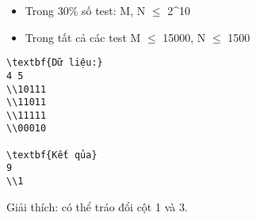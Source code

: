 \begin{itemize}
	\item     Trong 30\% số test: M, N  $\le$  2^10   
	\item     Trong tất cả các test M  $\le$  15000, N  $\le$  1500   
\end{itemize}
\begin{verbatim}
\textbf{Dữ liệu:}
4 5
\\10111
\\11011
\\11111
\\00010

\textbf{Kết qủa}
9
\\1
\end{verbatim}

   Giải thích: có thể tráo đổi cột 1 và 3.